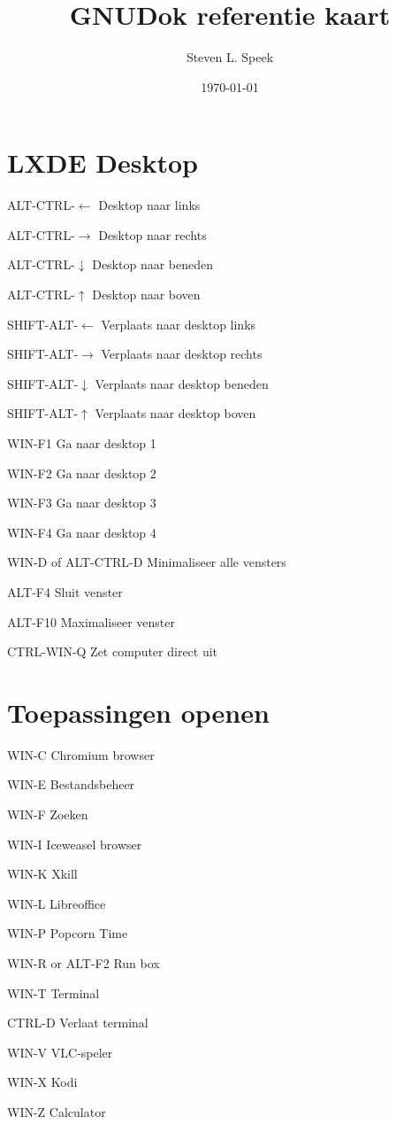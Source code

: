 \documentclass[10pt]{article}
\title{GNUDok referentie kaart}
\author{Steven L. Speek}
\date{\today{}}
\renewcommand{\maketitle}{%
{\begin{center}\Large \mythetitle\end{center}}
}
\begin{document}
\begin{multicols}{3}
	\maketitle

	\section{LXDE Desktop}
	\begin{ttdesc}[labelwidth=\widthof{\texttt{ALT-SHIFT-$\leftarrow$}}]
	\item[ALT-CTRL-$\leftarrow$] Desktop naar links
	\item[ALT-CTRL-$\rightarrow$] Desktop naar rechts
	\item[ALT-CTRL-$\downarrow$] Desktop naar beneden
	\item[ALT-CTRL-$\uparrow$] Desktop naar boven
	\item[SHIFT-ALT-$\leftarrow$] Verplaats naar desktop links
	\item[SHIFT-ALT-$\rightarrow$]Verplaats naar desktop rechts
	\item[SHIFT-ALT-$\downarrow$] Verplaats naar desktop beneden
	\item[SHIFT-ALT-$\uparrow$] Verplaats naar desktop boven
	\item[WIN-F1] Ga naar desktop 1
	\item[WIN-F2] Ga naar desktop 2
	\item[WIN-F3] Ga naar desktop 3
	\item[WIN-F4] Ga naar desktop 4
	\item[WIN-D of ALT-CTRL-D] Minimaliseer alle vensters
	\item[ALT-F4] Sluit venster
	\item[ALT-F10] Maximaliseer venster
	\item[CTRL-WIN-Q] Zet computer direct uit
	\end{ttdesc}
	\section{Toepassingen openen}
	\begin{ttdesc}[labelwidth=\widthof{\texttt{WIN-E or ALT-F2}}]
	\item[WIN-C] Chromium browser
	\item[WIN-E] Bestandsbeheer
	\item[WIN-F] Zoeken
	\item[WIN-I] Iceweasel browser
	\item[WIN-K] Xkill
	\item[WIN-L] Libreoffice
	\item[WIN-P] Popcorn Time
	\item[WIN-R or ALT-F2] Run box
	\item[WIN-T] Terminal
	\item[CTRL-D] Verlaat terminal
	\item[WIN-V] VLC-speler
	\item[WIN-X] Kodi
	\item[WIN-Z] Calculator
	\end{ttdesc}

\end{multicols}
\end{document}
